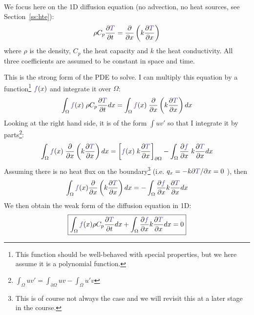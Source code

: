 We focus here on the 1D diffusion equation (no advection, no heat sources, see Section~\ref{ss:hte}):
\begin{equation}
\rho C_p \frac{\partial {\color{Violet}T}}{\partial t} 
= \frac{\partial }{\partial x} \left( k \frac{\partial {\color{Violet}T}}{\partial x}  \right)
\end{equation}
where $\rho$ is the density, $C_p$ the heat capacity and $k$ the heat conductivity. All three coefficients
are assumed to be constant in space and time.

This is the {\color{olive}strong form} of the PDE to solve. 
I can multiply this equation by a function\footnote{This function should be well-behaved with 
special properties, but we here assume it is a polynomial function.} ${\color{Violet}f}(x)$ 
and integrate it over $\Omega$:
\begin{equation}
\int_{\Omega} {\color{Violet}f}(x) \;  \rho C_p\frac{\partial {\color{Violet}T}}{\partial t} dx
=
\int_{\Omega} {\color{Violet}f}(x) \;  \frac{\partial }{\partial x} \left( k \frac{\partial {\color{Violet}T}}{\partial x}  \right) dx
\end{equation}
Looking at the right hand side, it is of the form $\int u v'$ so that I 
integrate it by parts\footnote{$\int_\Omega uv' = \int_{\partial\Omega} uv - \int_\Omega u'v$}:
\begin{equation}
\int_{\Omega} {\color{Violet}f}(x) \;  \frac{\partial }{\partial x} 
\left( k \frac{\partial {\color{Violet}T}}{\partial x}  \right) dx
=
\left[
 {\color{Violet}f}(x) \;  k \frac{\partial {\color{Violet}T}}{\partial x}
\right]_{\partial \Omega}
-
\int_{\Omega} \frac{\partial {\color{Violet}f}}{\partial x} \;   k \frac{\partial {\color{Violet}T}}{\partial x}  dx
\end{equation}
Assuming there is no heat flux on the boundary\footnote{This is of course not always the case
and we will revisit this at a later stage in the course.} (i.e. $q_x= - k \partial {\color{Violet}T}/\partial x = 0$ ), then
\begin{equation}
\int_{\Omega} {\color{Violet}f}(x) \frac{\partial }{\partial x} \left( k \frac{\partial {\color{Violet}T}}{\partial x}  
\right) dx
=
- \int_{\Omega} \frac{\partial {\color{Violet}f}}{\partial x}  k \frac{\partial {\color{Violet}T}}{\partial x}  dx
\end{equation}
We then obtain the {\color{olive}weak form} of the diffusion equation in 1D:
\begin{equation}
\boxed{
\int_{\Omega} {\color{Violet}f}(x) \rho C_p \frac{\partial {\color{Violet}T}}{\partial t} dx
+
\int_{\Omega} \frac{\partial {\color{Violet}f}}{\partial x}  k \frac{\partial {\color{Violet}T}}{\partial x}  dx = 0
}
\end{equation}
